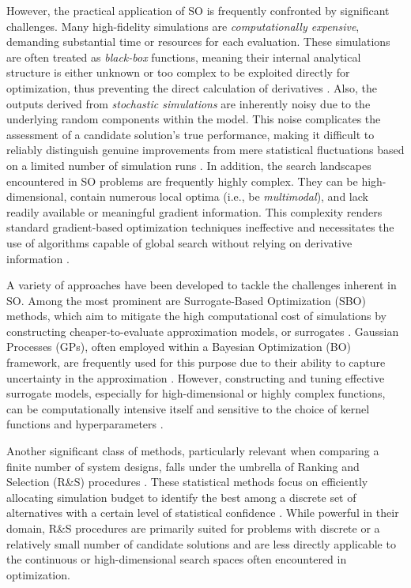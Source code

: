 \documentclass{article}
\begin{document}
However, the practical application of SO is frequently confronted by significant challenges. Many high-fidelity simulations are \textit{computationally expensive}, demanding substantial time or resources for each evaluation. These simulations are often treated as \textit{black-box} functions, meaning their internal analytical structure is either unknown or too complex to be exploited directly for optimization, thus preventing the direct calculation of derivatives \cite{TEKIN01112004}. Also, the outputs derived from \textit{stochastic simulations} are inherently noisy due to the underlying random components within the model. This noise complicates the assessment of a candidate solution's true performance, making it difficult to reliably distinguish genuine improvements from mere statistical fluctuations based on a limited number of simulation runs \cite{717096}. In addition, the search landscapes encountered in SO problems are frequently highly complex. They can be high-dimensional, contain numerous local optima (i.e., be \textit{multimodal}), and lack readily available or meaningful gradient information. This complexity renders standard gradient-based optimization techniques ineffective and necessitates the use of algorithms capable of global search without relying on derivative information \cite{figueira2014hybrid}.



A variety of approaches have been developed to tackle the challenges inherent in SO. Among the most prominent are Surrogate-Based Optimization (SBO) methods, which aim to mitigate the high computational cost of simulations by constructing cheaper-to-evaluate approximation models, or surrogates \cite{hong2021surrogate}. Gaussian Processes (GPs), often employed within a Bayesian Optimization (BO) framework, are frequently used for this purpose due to their ability to capture uncertainty in the approximation \cite{9004680}. However, constructing and tuning effective surrogate models, especially for high-dimensional or highly complex functions, can be computationally intensive itself and sensitive to the choice of kernel functions and hyperparameters \cite{fan2024review}.

Another significant class of methods, particularly relevant when comparing a finite number of system designs, falls under the umbrella of Ranking and Selection (R\&S) procedures \cite{boesel2003using}. These statistical methods focus on efficiently allocating simulation budget to identify the best among a discrete set of alternatives with a certain level of statistical confidence \cite{hong2021review}. While powerful in their domain, R\&S procedures are primarily suited for problems with discrete or a relatively small number of candidate solutions and are less directly applicable to the continuous or high-dimensional search spaces often encountered in optimization.
\end{document}
